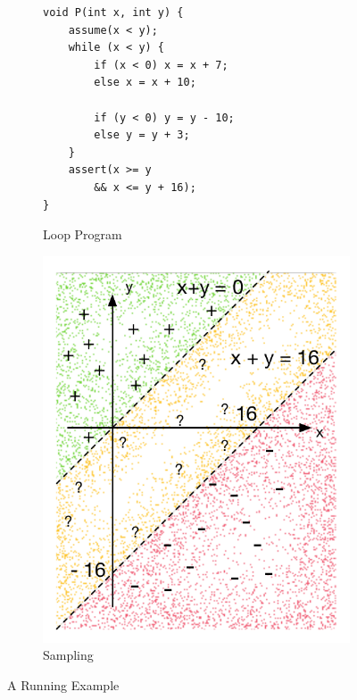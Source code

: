 \begin{figure}[t]
\begin{subfigure}{0.2\textwidth}
    \centering
    \vspace{0.5cm}
{\scriptsize\begin{verbatim}
void P(int x, int y) {
    assume(x < y);
    while (x < y) {
        if (x < 0) x = x + 7;
        else x = x + 10;
        
        if (y < 0) y = y - 10;
        else y = y + 3; 
    }
    assert(x >= y
        && x <= y + 16);
}
\end{verbatim}}
    \vspace{0.5cm}
    \caption{Loop Program}
    \label{fig:running:example:program}
\end{subfigure}%
\begin{subfigure}{.3\textwidth}
      \centering
      \includegraphics[scale=0.42]{figures/running-sampling.pdf}
      \caption{Sampling}
      \label{fig:running:example:sampling}
\end{subfigure}
\caption{A Running Example}
\label{fig:running:example}
\end{figure}

